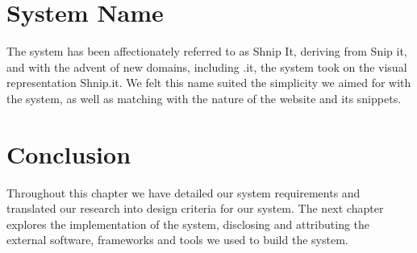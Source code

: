 \section{System Name}
The system has been affectionately referred to as Shnip It, deriving from Snip it, and with the advent of new domains, including .it, the system took on the visual representation Shnip.it.
We felt this name suited the simplicity we aimed for with the system, as well as matching with the nature of the website and its snippets.

\section{Conclusion}
Throughout this chapter we have detailed our system requirements and translated our research into design criteria for our system.
The next chapter explores the implementation of the system, disclosing and attributing the external software, frameworks and tools we used to build the system.

